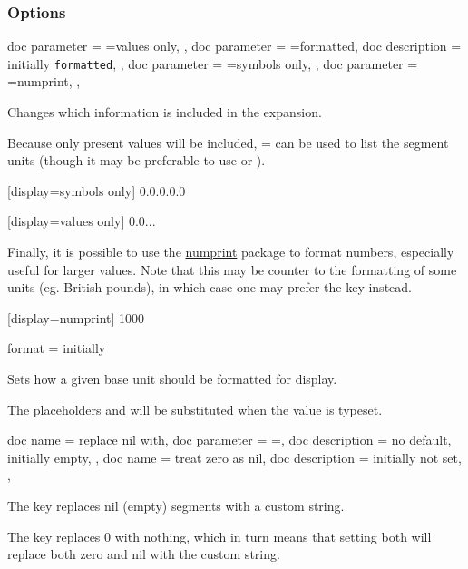 \documentclass[
	a4paper,
]{article}
\begin{document}
\clearpage
\subsubsection{Options}
	
\begin{docKeys}[
		doc name = display,
	]{
		{
			doc parameter = {=values only},
		},
		{
			doc parameter = {=formatted},
			doc description = initially \texttt{formatted},
		},
		{
			doc parameter = {=symbols only},
		},
		{
			doc parameter = {=numprint},
		},
	}

	Changes which information is included in the expansion.

	Because only present values will be included, = can be used to list the segment units (though it may be preferable to use  or ).

\begin{dispExample}
	[display=symbols only]
	{0.0.0.0.0}

	[display=values only]
	{0.0...}
\end{dispExample}
	
	Finally, it is possible to use the \href{https://ctan.org/pkg/numprint}{numprint} package to format numbers, especially useful for larger values. Note that this may be counter to the formatting of some units (eg. British pounds), in which case one may prefer the  key instead.

\begin{dispExample}
	[display=numprint]
	{1000}
\end{dispExample}
\end{docKeys}

\begin{docKey}
	{format}
	{=}
	{initially }

	Sets how a given base unit should be formatted for display.
	
	The placeholders  and  will be substituted when the value is typeset.
\end{docKey}

\begin{docKeys}
	[]
	{
		{
			doc name = replace nil with,
			doc parameter = {=},
			doc description = {no default, initially empty},
		},
		{
			doc name = treat zero as nil,
			doc description = {initially not set},
		},
	}

The key  replaces nil (empty) segments with a custom string.

The key  replaces 0 with nothing, which in turn means that setting both will replace both zero and nil with the custom string.

\end{docKeys}
\end{document}
